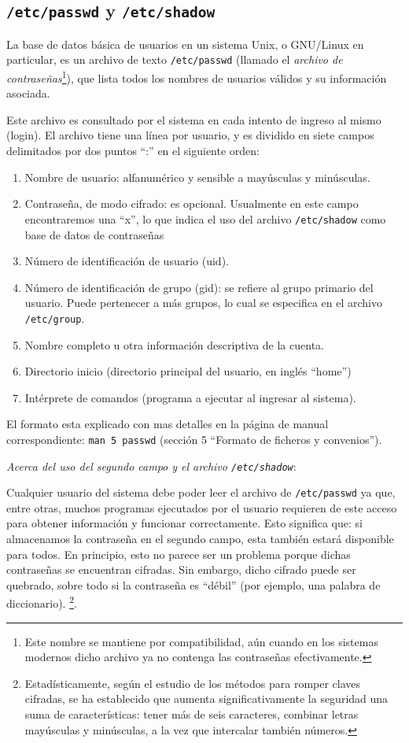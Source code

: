 \documentclass[12pt]{article}
\begin{document}
\subsection{ \texttt{/etc/passwd} y \texttt{/etc/shadow}}

La base de datos básica de usuarios en un sistema Unix, o GNU/Linux en particular, 
es un archivo de texto  \texttt{/etc/passwd} (llamado el \textit{archivo de
contraseñas}\footnote{Este nombre se mantiene por compatibilidad, aún cuando 
en los sistemas modernos dicho archivo ya no contenga las contraseñas efectivamente.}), 
que lista todos los nombres de usuarios válidos y su información asociada. 

Este archivo es consultado por el sistema en cada intento de ingreso al mismo (login).
El archivo tiene una línea por usuario, y es dividido en siete campos delimitados por 
dos puntos ``:'' en el siguiente orden:


	\begin{enumerate}
	\item{Nombre de usuario: alfanumérico y sensible a mayúsculas y minúsculas.}
	\item{Contraseña, de modo cifrado: es opcional. Usualmente en este campo encontraremos 
	una ``x'', lo que indica el uso del archivo \texttt{/etc/shadow} como base de datos de 
	contraseñas}
	\item{Número de identificación de usuario (uid).} 
	\item{Número de identificación de grupo (gid): se refiere al grupo primario del usuario. Puede 
	pertenecer a más grupos, lo cual se especifica en el archivo \texttt{/etc/group}}.
	\item{Nombre completo u otra información descriptiva de la cuenta.}
	\item{Directorio inicio (directorio principal del usuario, en inglés ``home'')}
	\item{Intérprete de comandos (programa a ejecutar al ingresar al sistema).}
	\end{enumerate}

El formato esta explicado con mas detalles en la página de manual correspondiente: 
\texttt{man 5 passwd} (sección 5 ``Formato de ficheros y convenios'').

\textit{Acerca del uso del segundo campo y el archivo \texttt{/etc/shadow}}: 

Cualquier usuario del sistema debe poder leer el archivo de \texttt{/etc/passwd}
ya que, entre otras, muchos programas ejecutados por el usuario requieren de este acceso 
para obtener información y funcionar correctamente. Esto significa que: si almacenamos 
la contraseña en el segundo campo, esta también estará disponible para todos. En principio, 
esto no parece ser un problema porque dichas contraseñas se encuentran cifradas.  
Sin embargo, dicho cifrado puede ser quebrado, sobre todo si la contraseña es ``débil'' (por ejemplo, 
una palabra de diccionario).  \footnote{Estadísticamente, según el estudio de
los métodos para romper claves cifradas, se ha establecido que aumenta
significativamente la seguridad una suma de características: tener más de seis
caracteres, combinar letras mayúsculas y minúsculas, a la vez que intercalar
también números.}. 
\end{document}
